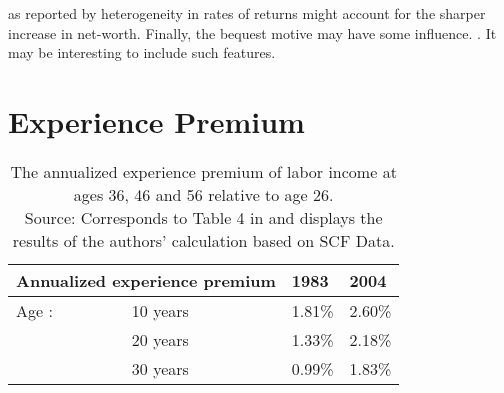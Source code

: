 \documentclass[a4paper,12pt,legno]{article}
\begin{document}
as reported by \cite{benhabib2011distribution} heterogeneity in rates of returns might account for the sharper increase in net-worth. Finally, the bequest motive may have some influence. \cite{denardi2014}. It may be interesting to include such features. 

\label{Chapter6}


\newpage





\newpage


\appendix
\section{Experience Premium}
 \label{table_experience_premium}  


\begin{table}[!htbp]
\centering
\begin{threeparttable}
\setlength{\tabcolsep}{3em}
\caption[The annualized experience premium of labor income at ages 36, 46 and 56 relative to age 26.Source: Corresponds to Table 4 in \cite{hintermaier2011} and is based on the authors' calculation based on SCF Data.]{The annualized experience premium of labor income at ages 36, 46 and 56 relative to age 26.\\\hspace{\textwidth} Source: Corresponds to Table 4 in \cite{hintermaier2011} and displays the results of the authors' calculation based on SCF Data.}
\label{my-label}
\begin{tabular}{@{}llll@{}}
\toprule
\multicolumn{2}{l}{Annualized experience premium} & 1983   & 2004   \\ \midrule
Age \textendash  26:& 10 years               & 1.81\% & 2.60\% \\
                         & 20 years               & 1.33\% & 2.18\% \\
                         & 30 years               & 0.99\% & 1.83\% \\ \bottomrule
\end{tabular}
\end{threeparttable}
\end{table}
\end{document}
